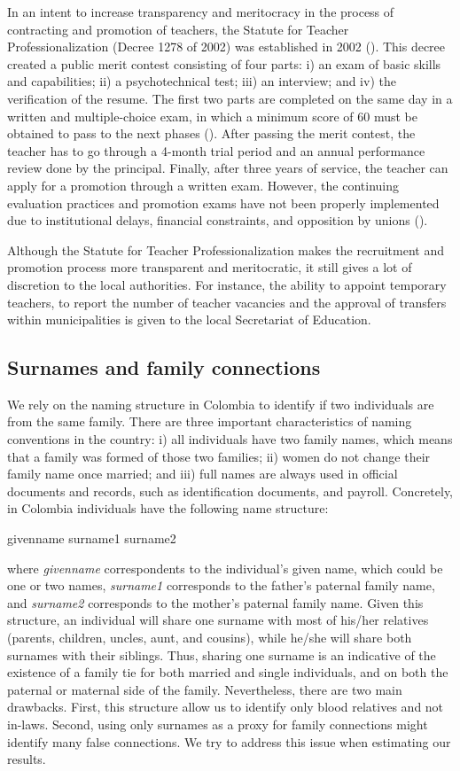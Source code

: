 \documentclass[12pt,runningheads]{article}
\begin{document}
In an intent to increase transparency and meritocracy in the process of contracting and promotion of teachers, the Statute for Teacher Professionalization (Decree 1278 of 2002) was established in 2002 (). This decree created a public merit contest consisting of four parts: i) an exam of basic skills and capabilities; ii) a psychotechnical test; iii) an interview; and iv) the verification of the resume. The first two parts are completed on the same day in a written and multiple-choice exam, in which a minimum score of 60 must be obtained to pass to the next phases (). After passing the merit contest, the teacher has to go through a 4-month trial period and an annual performance review done by the principal. Finally, after three years of service, the teacher can apply for a promotion through a written exam. However, the continuing evaluation practices and promotion exams have not been properly implemented due to institutional delays, financial constraints, and opposition by unions ().

Although the Statute for Teacher Professionalization makes the recruitment and promotion process more transparent and meritocratic, it still gives a lot of discretion to the local authorities. For instance, the ability to appoint temporary teachers, to report the number of teacher vacancies and the approval of transfers within municipalities is given to the local Secretariat of Education. 

\subsection{Surnames and family connections} 

We rely on the naming structure in Colombia to identify if two individuals are from the same family. There are three important characteristics of naming conventions in the country: i) all individuals have two family names, which means that a family was formed of those two families; ii) women do not change their family name once married; and iii) full names are always used in official documents and records, such as identification documents, and payroll. Concretely, in Colombia individuals have the following name structure:
\begin{center}
    givenname surname1 surname2
\end{center}
where \textit{givenname} correspondents to the individual's given name, which could be one or two names, \textit{surname1} corresponds to the father's paternal family name, and \textit{surname2} corresponds to the mother's paternal family name. Given this structure, an individual will share one surname with most of his/her relatives (parents, children, uncles, aunt, and cousins), while he/she will share both surnames with their siblings. Thus, sharing one surname is an indicative of the existence of a family tie for both married and single individuals, and on both the paternal or maternal side of the family. Nevertheless, there are two main drawbacks. First, this structure allow us to identify only blood relatives and not in-laws. Second, using only surnames as a proxy for family connections might identify many false connections. We try to address this issue when estimating our results. 
\end{document}
